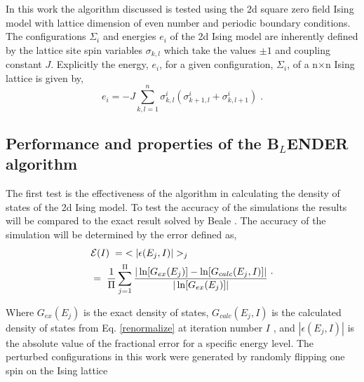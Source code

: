 \documentclass[aps,pre,reprint,superscriptaddress,showkeys]{revtex4-2}
\begin{document}
In this work the algorithm discussed is tested using the 2d square zero field  Ising model with lattice dimension of even number\cite{exact_statistical,Onsager,Ising} and periodic boundary conditions. The configurations $\Sigma_i$ and energies $e_i$ of the 2d Ising model are inherently defined by the lattice site spin variables $\sigma_{k,l}$ which take the values $\pm 1$ and coupling constant $J$. Explicitly the energy, $e_i$, for a given configuration, $\Sigma_i$, of a n$\times$n Ising lattice is given by, 
\begin{equation}
e_i = -J\sum_{k,l=1}^{n}\sigma_{k,l}^{i}(\sigma_{k+1,l}^{i} + \sigma_{k,l+1}^{i})\;.
\end{equation}

\subsection{Performance and properties of the B$_L$ENDER algorithm}
  The first test is the effectiveness of the algorithm in calculating the density of states of the 2d Ising model.  To test the accuracy of the simulations the results will be compared to the exact result solved by Beale \cite{Beale_2d_ising}. The accuracy of the simulation will be determined by the error defined as, 
\begin{equation}
\begin{split}
 &\mathcal{E}(I) \hspace{0.1cm}= \hspace{0.1cm}< |\epsilon(E_j,I)| >_j\\
& = \hspace{0.1cm}  \frac{1}{\Pi} \sum_{j=1}^{\Pi}\frac{|\ln[G_{ex}(E_j)]- \ln[G_{calc}(E_j,I)]|}{|\ln[G_{ex}(E_j)]|}\; 
 \end{split}. 
 \label{avg_error}
\end{equation}

Where $G_{ex}(E_j)$ is the exact density of states, $G_{calc}(E_j,I)$ is the calculated density of states from Eq. \ref{renormalize}  at iteration number $I$ , and $|\epsilon(E_j,I)|$ is the absolute value of the fractional error for a specific energy level.  The perturbed configurations in this work were generated by randomly flipping one spin on the Ising lattice
\end{document}
